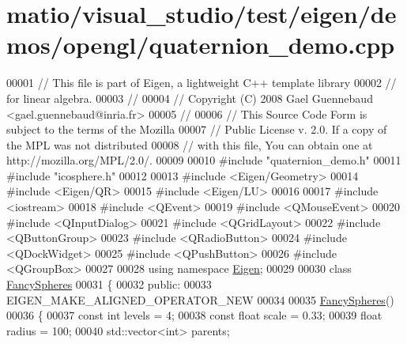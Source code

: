 \hypertarget{matio_2visual__studio_2test_2eigen_2demos_2opengl_2quaternion__demo_8cpp_source}{}\section{matio/visual\+\_\+studio/test/eigen/demos/opengl/quaternion\+\_\+demo.cpp}
\label{matio_2visual__studio_2test_2eigen_2demos_2opengl_2quaternion__demo_8cpp_source}

\begin{DoxyCode}
00001 \textcolor{comment}{// This file is part of Eigen, a lightweight C++ template library}
00002 \textcolor{comment}{// for linear algebra.}
00003 \textcolor{comment}{//}
00004 \textcolor{comment}{// Copyright (C) 2008 Gael Guennebaud <gael.guennebaud@inria.fr>}
00005 \textcolor{comment}{//}
00006 \textcolor{comment}{// This Source Code Form is subject to the terms of the Mozilla}
00007 \textcolor{comment}{// Public License v. 2.0. If a copy of the MPL was not distributed}
00008 \textcolor{comment}{// with this file, You can obtain one at http://mozilla.org/MPL/2.0/.}
00009 
00010 \textcolor{preprocessor}{#include "quaternion\_demo.h"}
00011 \textcolor{preprocessor}{#include "icosphere.h"}
00012 
00013 \textcolor{preprocessor}{#include <Eigen/Geometry>}
00014 \textcolor{preprocessor}{#include <Eigen/QR>}
00015 \textcolor{preprocessor}{#include <Eigen/LU>}
00016 
00017 \textcolor{preprocessor}{#include <iostream>}
00018 \textcolor{preprocessor}{#include <QEvent>}
00019 \textcolor{preprocessor}{#include <QMouseEvent>}
00020 \textcolor{preprocessor}{#include <QInputDialog>}
00021 \textcolor{preprocessor}{#include <QGridLayout>}
00022 \textcolor{preprocessor}{#include <QButtonGroup>}
00023 \textcolor{preprocessor}{#include <QRadioButton>}
00024 \textcolor{preprocessor}{#include <QDockWidget>}
00025 \textcolor{preprocessor}{#include <QPushButton>}
00026 \textcolor{preprocessor}{#include <QGroupBox>}
00027 
00028 \textcolor{keyword}{using namespace }\hyperlink{namespace_eigen}{Eigen};
00029 
00030 \textcolor{keyword}{class }\hyperlink{class_fancy_spheres}{FancySpheres}
00031 \{
00032   \textcolor{keyword}{public}:
00033     EIGEN\_MAKE\_ALIGNED\_OPERATOR\_NEW
00034     
00035     \hyperlink{class_fancy_spheres}{FancySpheres}()
00036     \{
00037       \textcolor{keyword}{const} \textcolor{keywordtype}{int} levels = 4;
00038       \textcolor{keyword}{const} \textcolor{keywordtype}{float} scale = 0.33;
00039       \textcolor{keywordtype}{float} radius = 100;
00040       std::vector<int> parents;

\end{DoxyCode}
